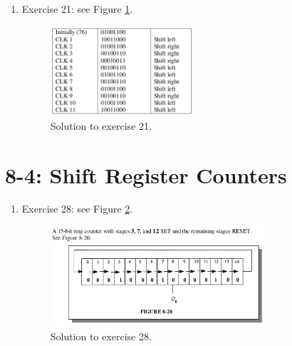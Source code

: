 \documentclass[10pt]{article}
\begin{document}
\begin{enumerate}
\item Exercise 21: see Figure \ref{fig:wave2}.
\begin{figure}[ht]
\centering
\includegraphics[width=0.5\textwidth]{code/exercise21.png}
\caption{\label{fig:wave2} Solution to exercise 21.}
\end{figure}
\end{enumerate}

\section{8-4: Shift Register Counters}

\begin{enumerate}
\item Exercise 28: see Figure \ref{fig:wave3}.
\begin{figure}
\centering
\includegraphics[width=0.75\textwidth]{code/exercise28.png}
\caption{\label{fig:wave3} Solution to exercise 28.}
\end{figure}
\end{enumerate}
\end{document}
